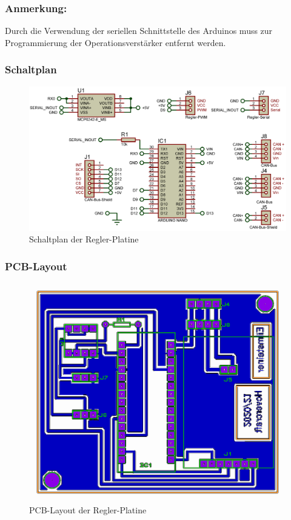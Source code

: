\subsubsection{Anmerkung:}
Durch die Verwendung der seriellen Schnittstelle des Arduinos muss zur Programmierung der Operationsverstärker entfernt werden.
\newpage

\subsubsection{Schaltplan}
\begin{figure}[h]
    \centering
    \includegraphics[width=1.0\textwidth]{../Proteus/Exports/Regler-Platine.png}    
    \caption{Schaltplan der Regler-Platine\label{fig:plat:regler}}
\end{figure}

\newpage

\subsubsection{PCB-Layout}
\begin{figure}[h]
    \centering
    \includegraphics[width=1.0\textwidth]{../Proteus/Exports/Regler_Platine_PCB.png}    
    \caption{PCB-Layout der Regler-Platine}
\end{figure}


